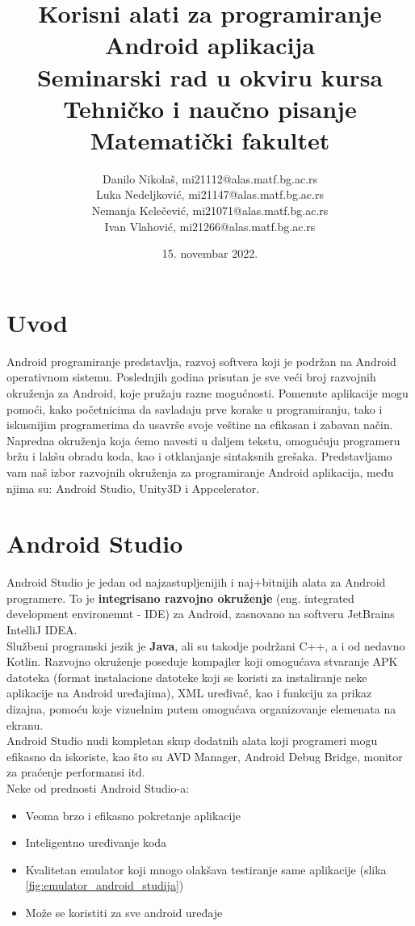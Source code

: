 \documentclass[12pt]{article}
\title{Korisni alati za programiranje Android aplikacija\\ \small{Seminarski rad u okviru kursa\\Tehničko i naučno pisanje\\ Matematički fakultet}}
\author{Danilo Nikolaš, mi21112@alas.matf.bg.ac.rs \\ Luka Nedeljković, mi21147@alas.matf.bg.ac.rs \\ Nemanja Kelečević, mi21071@alas.matf.bg.ac.rs \\ Ivan Vlahović, mi21266@alas.matf.bg.ac.rs}
\date{15. novembar 2022.}
\begin{document}
\maketitle
{}
\tableofcontents
\pagebreak

\section{Uvod}
Android programiranje predstavlja, razvoj softvera koji je podržan na Android operativnom sistemu.
Poslednjih godina prisutan je sve veći broj razvojnih okruženja za Android, koje pružaju razne mogućnosti. Pomenute aplikacije mogu pomoći, 
kako početnicima da savladaju prve korake u programiranju, tako i iskusnijim programerima da usavrše svoje veštine na efikasan i zabavan način.
Napredna okruženja koja ćemo navesti u daljem tekstu, omogućuju programeru bržu i lakšu obradu koda, kao i otklanjanje sintaksnih grešaka. 
Predstavljamo vam naš izbor razvojnih okruženja za programiranje Android aplikacija, među njima su: Android Studio, Unity3D i Appcelerator. \

\section{Android Studio}
Android Studio je jedan od najzastupljenijih i naj+bitnijih alata za Android programere. To je \textbf{integrisano razvojno okruženje} (eng. integrated development environemnt - IDE) za Android, zasnovano na softveru JetBrains IntelliJ IDEA.  \\
\hspace*{0.7cm}Službeni programski jezik je \textbf{Java}, ali su takodje podržani C++, a i od nedavno Kotlin. Razvojno okruženje poseduje kompajler koji omogućava stvaranje APK datoteka (format instalacione datoteke koji se koristi za instaliranje neke aplikacije na Android uređajima), XML uređivač, kao i funkciju za prikaz dizajna, pomoću koje vizuelnim putem omogućava organizovanje elemenata na ekranu.\cite{Android Studio} \\
\hspace*{0.7cm}Android Studio nudi kompletan skup dodatnih alata koji programeri mogu efikasno da iskoriste, kao što su AVD Manager, Android Debug Bridge, monitor za praćenje performansi itd.\\
\hspace*{0.7cm}Neke od prednosti Android Studio-a:
\begin{itemize}
\item{Veoma brzo i efikasno pokretanje aplikacije}
\item{Inteligentno uređivanje koda} 
\item{Kvalitetan emulator koji mnogo olakšava testiranje same aplikacije (slika \ref{fig:emulator_android_studija})}
\item{Može se koristiti za sve android uređaje}
\end{itemize}
\end{document}
